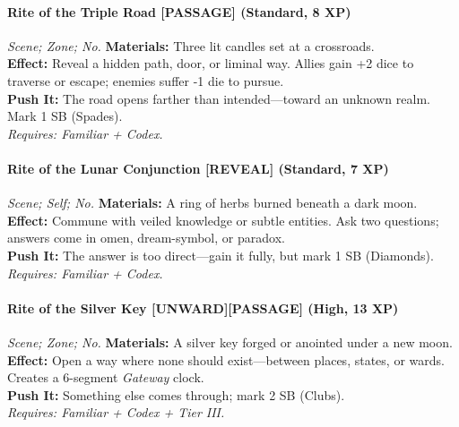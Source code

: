 \paragraph{Rite of the Triple Road \textnormal{[PASSAGE]} (Standard, 8 XP)}  
\emph{Scene; Zone; No.}  
\textbf{Materials:} Three lit candles set at a crossroads. \\  
\textbf{Effect:} Reveal a hidden path, door, or liminal way. Allies gain +2 dice to traverse or escape; enemies suffer -1 die to pursue. \\  
\textbf{Push It:} The road opens farther than intended—toward an unknown realm. Mark 1 SB (Spades). \\  
\emph{Requires: Familiar + Codex.}

\paragraph{Rite of the Lunar Conjunction \textnormal{[REVEAL]} (Standard, 7 XP)}  
\emph{Scene; Self; No.}  
\textbf{Materials:} A ring of herbs burned beneath a dark moon. \\  
\textbf{Effect:} Commune with veiled knowledge or subtle entities. Ask two questions; answers come in omen, dream-symbol, or paradox. \\  
\textbf{Push It:} The answer is too direct—gain it fully, but mark 1 SB (Diamonds). \\  
\emph{Requires: Familiar + Codex.}

\paragraph{Rite of the Silver Key \textnormal{[UNWARD][PASSAGE]} (High, 13 XP)}  
\emph{Scene; Zone; No.}  
\textbf{Materials:} A silver key forged or anointed under a new moon. \\  
\textbf{Effect:} Open a way where none should exist—between places, states, or wards. Creates a 6-segment \emph{Gateway} clock. \\  
\textbf{Push It:} Something else comes through; mark 2 SB (Clubs). \\  
\emph{Requires: Familiar + Codex + Tier III.}

